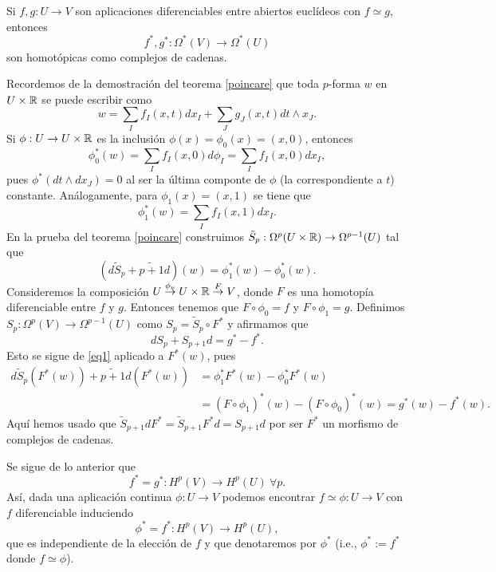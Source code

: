 \documentclass[CV.tex]{subfiles}
\begin{document}
\begin{teorema}
Si $f,g:U→V$ son aplicaciones diferenciables entre abiertos euclídeos con $f≃g$, entonces
$$f^*,g^*:Ω^*(V)→Ω^*(U)$$
son homotópicas como complejos de cadenas.
\end{teorema}
\begin{dem}
Recordemos de la demostración del teorema \ref{poincare} que toda $p$-forma $w$ en $U\times\mathbb{R}$ se puede escribir como 
\[
w=\sum_If_I(x,t)dx_I+\sum_Jg_J(x,t)dt\land x_J.
\]
Si $\phi:U\to U\times\mathbb{R}$ es la inclusión $\phi(x)=\phi_0(x)=(x,0)$, entonces
\[
\phi_0^*(w)=\sum_If_I(x,0)d\phi_I=\sum_I f_I(x,0)dx_I,
\]
pues $\phi^*(dt\land dx_J)=0$ al ser la última componte de $\phi$ (la correspondiente a $t$) constante. Análogamente, para $\phi_1(x)=(x,1)$ se tiene que
\[
\phi_1^*(w)=\sum_I f_I(x,1)dx_I.
\]
En la prueba del teorema \ref{poincare} construimos $\tilde{S}_p:\Omega^p(U\times\mathbb{R})\to \Omega^{p-1}(U)$ tal que 
\begin{equation}\label{eq1}
(d\tilde{S}_{p}+\tilde{p+1}d)(w)=\phi_1^*(w)-\phi_0^*(w).
\end{equation}
Consideremos la composición $U\overset{\phi_{\nu}}{\to}U\times\mathbb{R}\overset{F}{\to}V$, donde $F$ es una homotopía diferenciable entre $f$ y $g$. Entonces tenemos que $F\circ\phi_0=f$ y $F\circ \phi_1=g$. Definimos $S_p:\Omega^p(V)\to \Omega^{p-1}(U)$ como $S_p=\tilde{S}_p\circ F^*$ y afirmamos que
\[
dS_p+S_{p+1}d=g^*-f^*.
\]
Esto se sigue de \ref{eq1} aplicado a $F^*(w)$, pues 
\begin{align*}
d\tilde{S}_{p}(F^*(w))+\tilde{p+1}d(F^*(w))&=\phi_1^*F^*(w)-\phi_0^*F^*(w)\\
&=(F\circ\phi_1)^*(w)-(F\circ\phi_0)^*(w)=g^*(w)-f^*(w).
\end{align*}
Aquí hemos usado que $\tilde{S}_{p+1}dF^*=\tilde{S}_{p+1}F^*d=S_{p+1}d$ por ser $F^*$ un morfismo de complejos de cadenas.
\QED
\end{dem}

Se sigue de lo anterior que
$$f^*=g^*:H^p(V)→H^p(U)\ ∀p.$$
Así, dada una aplicación continua $ϕ:U→V$ podemos encontrar $f≃ϕ:U→V$ con $f$ diferenciable induciendo
$$ϕ^*=f^*:H^p(V)→H^p(U),$$
que es independiente de la elección de $f$ y que denotaremos por $ϕ^*$ (i.e., $ϕ^*:=f^*$ donde $f≃ϕ$).
\end{document}
